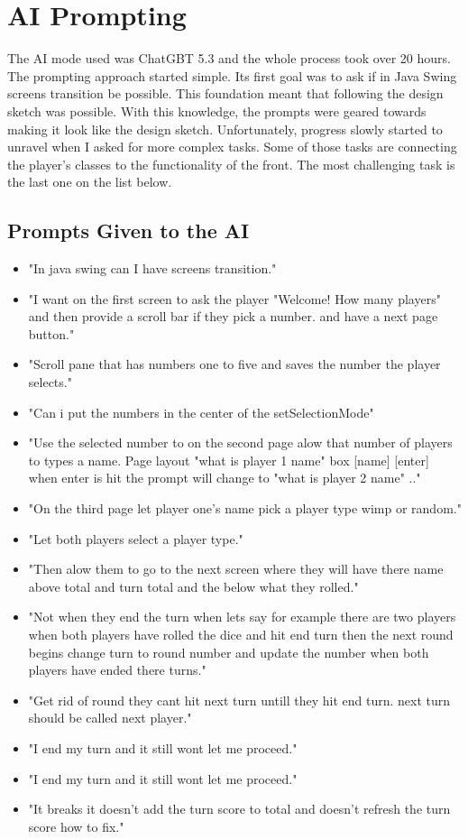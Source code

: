 \documentclass[a4paper,11pt]{article}
\begin{document}
\section*{AI Prompting}
The AI mode used was ChatGBT 5.3 and the whole process took over 20 hours. The prompting approach started simple. Its first goal was to ask if in Java Swing screens transition be possible. This foundation meant that following the design sketch was possible. With this knowledge, the prompts were geared towards making it look like the design sketch. Unfortunately, progress slowly started to unravel when I asked for more complex tasks. Some of those tasks are connecting the player's classes to the functionality of the front. The most challenging task is the last one on the list below.
\subsection*{Prompts Given to the AI}
\begin{itemize}
  \item "In java swing can I have screens transition."
  \item "I want on the first screen to ask the player "Welcome! How many players" and then provide a scroll bar if they pick a number. and have a next page button."
  \item "Scroll pane that has numbers one to five and saves the number the player selects."
  \item "Can i put the numbers in the center of the setSelectionMode"
  \item "Use the selected number to on the second page alow that number of players to types a name. Page layout "what is player 1 name" box [name] [enter] when enter is hit the prompt will change to "what is player 2 name" .."
  \item "On the third page let player one's name pick a player type wimp or random."
  \item "Let both players select a player type."
  \item "Then alow them to go to the next screen where they will have there name above total and turn total and the below what they rolled."
  \item "Not when they end the turn when lets say for example there are two players when both players have rolled the dice and hit end turn then the next round begins change turn to round number and update the number when both players have ended there turns."
  \item "Get rid of round they cant hit next turn untill they hit end turn. next turn should be called next player."
  \item "I end my turn and it still wont let me proceed."
  \item "I end my turn and it still wont let me proceed."
  \item "It breaks it doesn't add the turn score to total and doesn't refresh the turn score how to fix."
\end{itemize}
\end{document}
